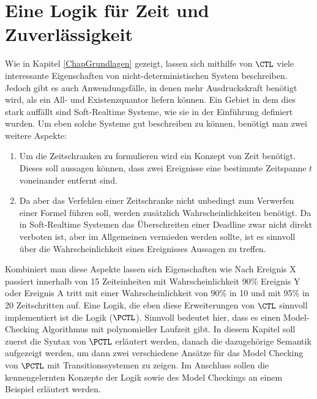 \section{Eine Logik für Zeit und Zuverlässigkeit}
\label{ChapSyntaxSemantik}


Wie in Kapitel \ref{ChapGrundlagen} gezeigt, lassen sich mithilfe von $\CTL$ viele interessante Eigenschaften von nicht-deterministischen System beschreiben. 
Jedoch gibt es auch Anwendungsfälle, in denen mehr Ausdruckskraft benötigt wird, als ein All- und Existenzquantor liefern können.
Ein Gebiet in dem dies stark auffällt sind Soft-Realtime Systeme, wie sie in der Einführung definiert wurden. 
Um eben solche Systeme gut beschreiben zu können, benötigt man zwei weitere Aspekte:
\begin{enumerate}
	\item Um die Zeitschranken zu formulieren wird ein Konzept von Zeit benötigt. Dieses soll aussagen können, dass zwei Ereignisse eine bestimmte Zeitspanne $t$ voneinander entfernt sind.
	\item Da aber das Verfehlen einer Zeitschranke nicht unbedingt zum Verwerfen einer Formel führen soll, werden zusätzlich Wahrscheinlichkeiten benötigt. 
	Da in Soft-Realtime Systemen das Überschreiten einer Deadline zwar nicht direkt verboten ist, aber im Allgemeinen vermieden werden sollte, ist es sinnvoll über die Wahrscheinlichkeit eines Ereignisses Aussagen zu treffen.
\end{enumerate}
Kombiniert man diese Aspekte lassen sich Eigenschaften wie \glqq Nach Ereignis X passiert innerhalb von 15 Zeiteinheiten mit Wahrscheinlichkeit 90\% Ereignis Y\grqq{} oder \glqq Ereignis A tritt mit einer Wahrscheinlichkeit von 90\% in 10 und mit 95\% in 20 Zeitschritten auf\grqq. 
Eine Logik, die eben diese Erweiterungen von $\CTL$ sinnvoll implementiert ist die Logik  ($\PCTL$). 
Sinnvoll bedeutet hier, dass es einen Model-Checking Algorithmus mit polynomieller Laufzeit gibt. 
In diesem Kapitel soll zuerst die Syntax von $\PCTL$ erläutert werden, danach die dazugehörige Semantik aufgezeigt werden, um dann zwei verschiedene Ansätze für das Model Checking von $\PCTL$ mit Transitionssystemen zu zeigen. 
Im Anschluss sollen die kennengelernten Konzepte der Logik sowie des Model Checkings an einem Beispiel erläutert werden.

